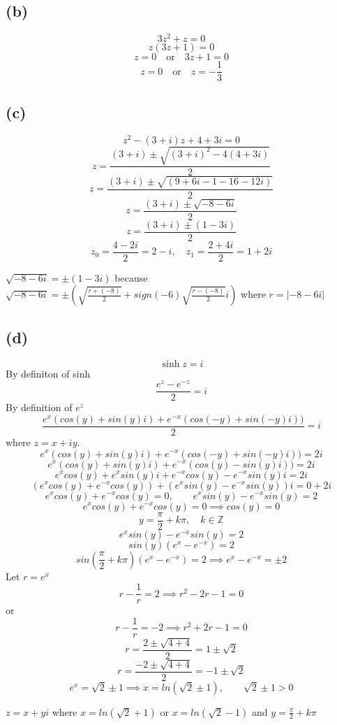 \documentclass{article}
\begin{document}
\subsection*{(b)}
\[
   3z^2 + z = 0
\]
\[
   z(3z + 1) = 0
\]
\[
   z = 0 \quad \text{or} \quad 3z + 1 = 0
\]
\[
   z = 0 \quad \text{or} \quad z = -\frac{1}{3}
\]

\subsection*{(c)}
\[
   z^2 - (3 + i)z + 4 + 3i = 0
\]
\[
   z = \frac{(3 + i) \pm \sqrt{(3 + i)^2 - 4(4 + 3i)}}{2}
\]
\[
   z = \frac{(3 + i) \pm \sqrt{(9 + 6i - 1 - 16 - 12i)}}{2}
\]
\[
   z = \frac{(3 + i) \pm \sqrt{-8 - 6i}}{2}
\]
\[
   z = \frac{(3 + i) \pm (1 - 3i)}{2}
\]
\[
   z_0 = \frac{4 - 2i}{2} = 2 - i, \quad z_1 = \frac{2 + 4i}{2} = 1 + 2i
\]

\(\sqrt{-8 - 6i} = \pm (1 - 3i)\) because \(\sqrt{-8 - 6i} = \pm (\sqrt{\frac{r+(-8)}{2}} + sign(-6)\sqrt{\frac{r-(-8)}{2}}i)\) where \(r = |-8 -6i|\)

\subsection*{(d)}

\[
   \sinh z = i
\]
By definiton of sinh
\[
   \frac{e^z - e^{-z}}{2} = i
\]
By definition of \(e^z\)
\[
   \frac{e^x(cos(y) + sin(y)i) + e^{-x}(cos(-y) + sin(-y)i))}{2} = i
\]
where \(z = x + iy\).
\[
   e^x(cos(y) + sin(y)i) + e^{-x}(cos(-y) + sin(-y)i)) = 2i
\]
\[
   e^x(cos(y) + sin(y)i) + e^{-x}(cos(y) - sin(y)i)) = 2i
\]
\[
   e^x cos(y) + e^x sin(y)i + e^{-x} cos(y) - e^{-x} sin(y) i = 2i
\]
\[
   (e^x cos(y) + e^{-x} cos(y)) + (e^x sin(y) - e^{-x} sin(y)) i = 0 + 2i
\]
\[
   e^x cos(y) + e^{-x} cos(y) = 0, \qquad e^x sin(y) - e^{-x} sin(y) = 2
\]
\[
   e^x cos(y) + e^{-x} cos(y) = 0 \implies cos(y) = 0
\]
\[
   y = \frac{\pi}{2} + k\pi, \quad k \in \mathbb{Z}
\]
\[
   e^x sin(y) - e^{-x} sin(y) = 2
\]
\[
   sin(y)(e^x - e^{-x}) = 2
\]
\[
   sin(\frac{\pi}{2} + k \pi)(e^x - e^{-x}) = 2 \implies e^x - e^{-x} = \pm 2
\]
Let \(r = e^x\)
\[
   r - \frac{1}{r} = 2 \implies r^2 - 2r - 1 = 0
\]
or
\[
   r - \frac{1}{r} = -2 \implies r^2 + 2r - 1 = 0
\]
\[
   r = \frac{2 \pm \sqrt{4 + 4}}{2} = 1 \pm \sqrt{2}
\]
\[
   r = \frac{-2 \pm \sqrt{4 + 4}}{2} = -1 \pm \sqrt{2}
\]
\[
   e^x = \sqrt{2} \pm 1 \implies x = ln(\sqrt{2} \pm 1), \qquad \sqrt{2} \pm 1 > 0
\]

\(z = x+yi\) where \(x = ln(\sqrt{2} + 1)\) or \(x = ln(\sqrt{2} - 1)\) and \(y = \frac{\pi}{2} + k\pi\)
\end{document}
